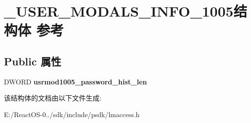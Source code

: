 \hypertarget{struct___u_s_e_r___m_o_d_a_l_s___i_n_f_o__1005}{}\section{\+\_\+\+U\+S\+E\+R\+\_\+\+M\+O\+D\+A\+L\+S\+\_\+\+I\+N\+F\+O\+\_\+1005结构体 参考}
\label{struct___u_s_e_r___m_o_d_a_l_s___i_n_f_o__1005}
\subsection*{Public 属性}
\begin{DoxyCompactItemize}
\item 
\mbox{\label{struct___u_s_e_r___m_o_d_a_l_s___i_n_f_o__1005_ae99d76d9e6347049aba21f1ad2689716}} 
D\+W\+O\+RD {\bfseries usrmod1005\+\_\+password\+\_\+hist\+\_\+len}
\end{DoxyCompactItemize}


该结构体的文档由以下文件生成\+:\begin{DoxyCompactItemize}
\item 
E\+:/\+React\+O\+S-\/0../sdk/include/psdk/lmaccess.\+h\end{DoxyCompactItemize}
